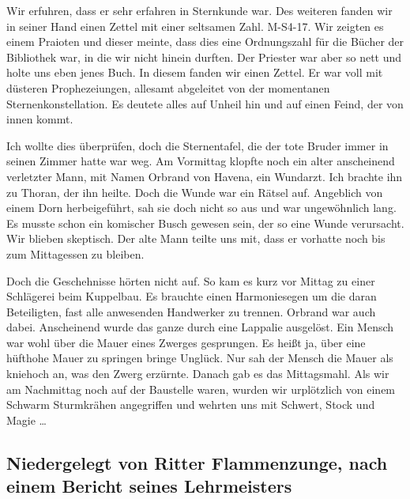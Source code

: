 \documentclass[11pt]{scrreprt}
\begin{document}
Wir erfuhren, dass er sehr erfahren in Sternkunde war. Des weiteren fanden wir in seiner Hand einen Zettel mit einer seltsamen Zahl. M-S4-17. Wir zeigten es einem Praioten und dieser meinte, dass dies eine Ordnungszahl für die Bücher der Bibliothek war, in die wir nicht hinein durften. Der Priester war aber so nett und holte uns eben jenes Buch. In diesem fanden wir einen Zettel. Er war voll mit düsteren Prophezeiungen, allesamt abgeleitet von der momentanen Sternenkonstellation. Es deutete alles auf Unheil hin und auf einen Feind, der von innen kommt.\par

Ich wollte dies überprüfen, doch die Sternentafel, die der tote Bruder immer in seinen Zimmer hatte war weg. Am Vormittag klopfte noch ein alter anscheinend verletzter Mann, mit Namen Orbrand von Havena, ein Wundarzt. Ich brachte ihn zu Thoran, der ihn heilte. Doch die Wunde war ein Rätsel auf. Angeblich von einem Dorn herbeigeführt, sah sie doch nicht so aus und war ungewöhnlich lang. Es musste schon ein komischer Busch gewesen sein, der so eine Wunde verursacht. Wir blieben skeptisch. Der alte Mann teilte uns mit, dass er vorhatte noch bis zum Mittagessen zu bleiben. \par

Doch die Geschehnisse hörten nicht auf. So kam es kurz vor Mittag zu einer Schlägerei beim Kuppelbau. Es brauchte einen Harmoniesegen um die daran Beteiligten, fast alle anwesenden Handwerker zu trennen. Orbrand war auch dabei. Anscheinend wurde das ganze durch eine Lappalie ausgelöst. Ein Mensch war wohl über die Mauer eines Zwerges gesprungen. Es heißt ja, über eine hüfthohe Mauer zu springen bringe Unglück. Nur sah der Mensch die Mauer als kniehoch an, was den Zwerg erzürnte. Danach gab es das Mittagsmahl. Als wir am Nachmittag noch auf der Baustelle waren, wurden wir urplötzlich von einem Schwarm Sturmkrähen angegriffen und wehrten uns mit Schwert, Stock und Magie …

\subsection{Niedergelegt von Ritter Flammenzunge, nach einem Bericht seines Lehrmeisters}
\end{document}
